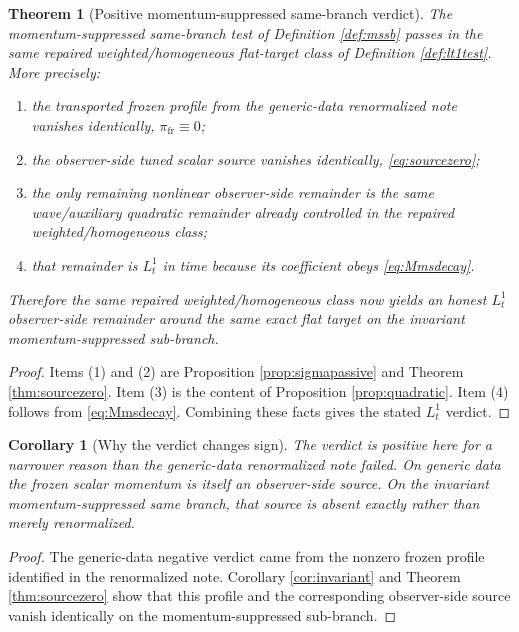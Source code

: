 \documentclass[11pt]{article}
\newtheorem{corollary}{Corollary}
\newtheorem{theorem}{Theorem}
\begin{document}
\begin{theorem}[Positive momentum-suppressed same-branch verdict]
\label{thm:positive}
The momentum-suppressed same-branch test of Definition \ref{def:mssb} passes in the same repaired weighted/homogeneous flat-target class of Definition \ref{def:lt1test}. More precisely:
\begin{enumerate}
    \item the transported frozen profile from the generic-data renormalized note vanishes identically, \(\pi_{\mathrm{fr}}\equiv 0\);
    \item the observer-side tuned scalar source vanishes identically, \eqref{eq:sourcezero};
    \item the only remaining nonlinear observer-side remainder is the same wave/auxiliary quadratic remainder already controlled in the repaired weighted/homogeneous class;
    \item that remainder is \(L_t^1\) in time because its coefficient obeys \eqref{eq:Mmsdecay}.
\end{enumerate}
Therefore the same repaired weighted/homogeneous class now yields an honest \(L_t^1\) observer-side remainder around the same exact flat target on the invariant momentum-suppressed sub-branch.
\end{theorem}

\begin{proof}
Items (1) and (2) are Proposition \ref{prop:sigmapassive} and Theorem \ref{thm:sourcezero}. Item (3) is the content of Proposition \ref{prop:quadratic}. Item (4) follows from \eqref{eq:Mmsdecay}. Combining these facts gives the stated \(L_t^1\) verdict.
\end{proof}

\begin{corollary}[Why the verdict changes sign]
\label{cor:whychanges}
The verdict is positive here for a narrower reason than the generic-data renormalized note failed. On generic data the frozen scalar momentum is itself an observer-side source. On the invariant momentum-suppressed same branch, that source is absent exactly rather than merely renormalized.
\end{corollary}

\begin{proof}
The generic-data negative verdict came from the nonzero frozen profile identified in the renormalized note. Corollary \ref{cor:invariant} and Theorem \ref{thm:sourcezero} show that this profile and the corresponding observer-side source vanish identically on the momentum-suppressed sub-branch.
\end{proof}
\end{document}
